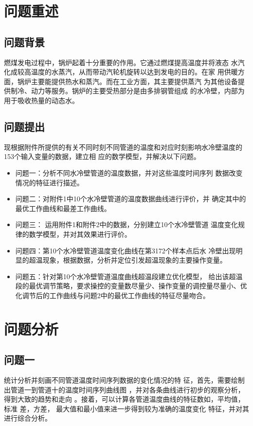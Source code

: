 \section{问题重述}
    \subsection{问题背景}
    燃煤发电过程中，锅炉起着十分重要的作用。它通过燃煤提高温度并将液态
    水汽化成较高温度的水蒸汽，从而带动汽轮机旋转以达到发电的目的。在家
    用供暖方面，锅炉主要能提供热水和蒸汽。而在工业方面，其主要提供蒸汽
    为其他设备提供制冷、动力等服务。锅炉的主要受热部分是由多排钢管组成
    的水冷壁，内部为用于吸收热量的动态水。
    \subsection{问题提出}
    现根据附件所提供的有关不同时刻不同管道的温度和对应时刻影响水冷壁温度的153个输入变量的数据，建立相
    应的数学模型，并解决以下问题。
    \begin{itemize}
        \item 问题一：分析不同水冷壁管道的温度数据，并对这些温度时间序列
            数据改变情况的特征进行描述。
        \item 问题二：对附件1中10个水冷壁管道的温度数据曲线进行评价，并
            确定其中的最优工作曲线和最差工作曲线。
        \item 问题三： 运用附件1和附件2中的数据，分别建立10个水冷壁管道
            温度变化规律的数学模型，并对其效果进行评价。
        \item 问题四：第10个水冷壁管道温度变化曲线在第3172个样本点后水
            冷壁出现明显的超温现象，根据数据，分析并定位引发超温现象的主要操作变量。
        \item 问题五：针对第10个水冷壁管道温度曲线超温段建立优化模型，
            给出该超温段的最优调节策略，要求操控的变量数尽量少、操作变量的调控量尽量小、优化调节后的工作曲线与问题2中的最优工作曲线的特征尽量吻合。
        
    \end{itemize}


\section{问题分析}
    \subsection{问题一}
    统计分析并刻画不同管道温度时间序列数据的变化情况的特
    征，首先，需要绘制出管道一到管道十的温度时间序列曲线图
    ，并对各条曲线进行初步的观察分析，得到大致的趋势和走向
    。接着，可以计算各管道温度曲线的特征数如，平均值，标准
    差，方差， 最大值和最小值来进一步得到较为准确的温度变化
    特征，并对其进行综合分析。 
